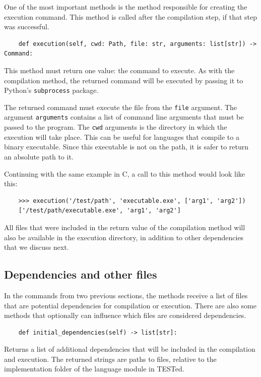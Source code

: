 \documentclass[../main]{subfiles}
\begin{document}
One of the most important methods is the method responsible for creating the execution command.
This method is called after the compilation step, if that step was successful.

\begin{verbatim}
    def execution(self, cwd: Path, file: str, arguments: list[str]) -> Command:
\end{verbatim}

This method must return one value: the command to execute.
As with the compilation method, the returned command will be executed by passing it to Python's \texttt{subprocess} package.

The returned command must execute the file from the \texttt{file} argument.
The argument \texttt{arguments} contains a list of command line arguments that must be passed to the program.
The \texttt{cwd} arguments is the directory in which the execution will take place.
This can be useful for languages that compile to a binary executable.
Since this executable is not on the path, it is safer to return an absolute path to it.

Continuing with the same example in C, a call to this method would look like this:

\begin{verbatim}
    >>> execution('/test/path', 'executable.exe', ['arg1', 'arg2'])
    ['/test/path/executable.exe', 'arg1', 'arg2']
\end{verbatim}

All files that were included in the return value of the compilation method will also be available in the execution directory, in addition to other dependencies that we discuss next.

\subsection{Dependencies and other files}\label{subsec:dependencies-and-other-files}

In the commands from two previous sections, the methods receive a list of files that are potential dependencies for compilation or execution.
There are also some methods that optionally can influence which files are considered dependencies.

\begin{verbatim}
    def initial_dependencies(self) -> list[str]:
\end{verbatim}

Returns a list of additional dependencies that will be included in the compilation and execution.
The returned strings are paths to files, relative to the implementation folder of the language module in TESTed.
\end{document}
